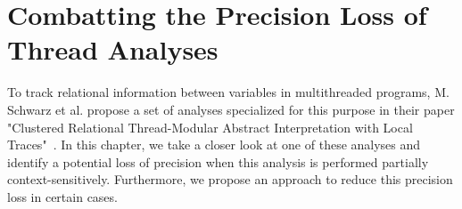
\chapter{Combatting the Precision Loss of Thread Analyses}\label{chapter:precisionLossThreadAnalyses}
  To track relational information between variables in multithreaded programs, M. Schwarz et al. propose a set of analyses specialized for this purpose in their paper "Clustered Relational Thread-Modular Abstract Interpretation with Local Traces"~\parencite{schwarz2023clustered}. In this chapter, we take a closer look at one of these analyses and identify a potential loss of precision when this analysis is performed partially context-sensitively. Furthermore, we propose an approach to reduce this precision loss in certain cases.
